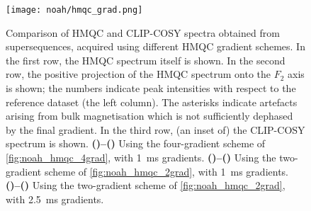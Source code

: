 \begin{figure}[!htbp]
    \centering
    \texttt{[image: noah/hmqc\_grad.png]}%
    {\label{fig:hmqc_grad_spec_4grad_1ms_hmqc}}%
    {\label{fig:hmqc_grad_spec_4grad_1ms_hmqcp}}%
    {\label{fig:hmqc_grad_spec_4grad_1ms_cosy}}%
    {\label{fig:hmqc_grad_spec_2grad_1ms_hmqc}}%
    {\label{fig:hmqc_grad_spec_2grad_1ms_hmqcp}}%
    {\label{fig:hmqc_grad_spec_2grad_1ms_cosy}}%
    {\label{fig:hmqc_grad_spec_2grad_2p5ms_hmqc}}%
    {\label{fig:hmqc_grad_spec_2grad_2p5ms_hmqcp}}%
    {\label{fig:hmqc_grad_spec_2grad_2p5ms_cosy}}%
    \caption[Comparison of  modules with different HMQC gradient schemes]{
        Comparison of HMQC and CLIP-COSY spectra obtained from  supersequences, acquired using different HMQC gradient schemes.
        In the first row, the HMQC spectrum itself is shown.
        In the second row, the positive projection of the HMQC spectrum onto the $F_2$ axis is shown; the numbers indicate peak intensities with respect to the reference dataset (the left column).
        The asterisks indicate artefacts arising from bulk magnetisation which is not sufficiently dephased by the final gradient.
        In the third row, (an inset of) the CLIP-COSY spectrum is shown.
        \textbf{()--()} Using the four-gradient scheme of \cref{fig:noah_hmqc_4grad}, with \qty{1}{ms} gradients.
        \textbf{()--()} Using the two-gradient scheme of \cref{fig:noah_hmqc_2grad}, with \qty{1}{ms} gradients.
        \textbf{()--()} Using the two-gradient scheme of \cref{fig:noah_hmqc_2grad}, with \qty{2.5}{ms} gradients.
    }
    \label{fig:hmqc_grad_spec}
\end{figure}

